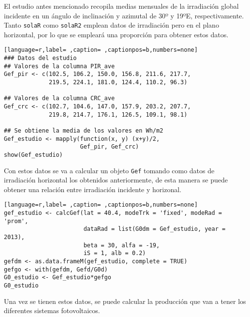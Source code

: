 El estudio antes mencionado recopila medias mensuales de la irradiación global incidente en un ángulo de inclinación y azimutal de 30º y 19ºE, respectivamente. Tanto \texttt{solaR} como \texttt{solaR2} emplean datos de irradiación pero en el plano horizontal, por lo que se empleará una proporción para obtener estos datos.
\begin{lstlisting}[language=r,label= ,caption= ,captionpos=b,numbers=none]
### Datos del estudio
## Valores de la columna PIR_ave
Gef_pir <- c(102.5, 106.2, 150.0, 156.8, 211.6, 217.7,
             219.5, 224.1, 181.0, 124.4, 110.2, 96.3)

## Valores de la columna CRC_ave
Gef_crc <- c(102.7, 104.6, 147.0, 157.9, 203.2, 207.7,
             219.8, 214.7, 176.1, 126.5, 109.1, 98.1)

## Se obtiene la media de los valores en Wh/m2
Gef_estudio <- mapply(function(x, y) (x+y)/2,
                      Gef_pir, Gef_crc)
show(Gef_estudio)
\end{lstlisting}
Con estos datos se va a calcular un objeto \texttt{Gef} tomando como datos de irradiación horizontal los obtenidos anteriormente, de esta manera se puede obtener una relación entre irradiación incidente y horizonal.
\begin{lstlisting}[language=r,label= ,caption= ,captionpos=b,numbers=none]
gef_estudio <- calcGef(lat = 40.4, modeTrk = 'fixed', modeRad = 'prom',
                       dataRad = list(G0dm = Gef_estudio, year = 2013),
                       beta = 30, alfa = -19,
                       iS = 1, alb = 0.2)
gefdm <- as.data.frameM(gef_estudio, complete = TRUE)
gefgo <- with(gefdm, Gefd/G0d)
G0_estudio <- Gef_estudio*gefgo
G0_estudio
\end{lstlisting}

Una vez se tienen estos datos, se puede calcular la producción que van a tener los diferentes sistemas fotovoltaicos.

